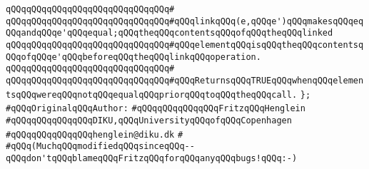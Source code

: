 \verb|qQQqqQQqqQQqqQQqqQQqqQQqqQQqqQQq#|\newline
\verb|qQQqqQQqqQQqqQQqqQQqqQQqqQQqqQQq#qQQqlinkqQQq(e,qQQqe')qQQqmakesqQQqeqQQqandqQQqe'qQQqequal;qQQqtheqQQqcontentsqQQqofqQQqtheqQQqlinked|\newline
\verb|qQQqqQQqqQQqqQQqqQQqqQQqqQQqqQQq#qQQqelementqQQqisqQQqtheqQQqcontentsqQQqofqQQqe'qQQqbeforeqQQqtheqQQqlinkqQQqoperation.|\newline
\verb|qQQqqQQqqQQqqQQqqQQqqQQqqQQqqQQq#|\newline
\verb|qQQqqQQqqQQqqQQqqQQqqQQqqQQqqQQq#qQQqReturnsqQQqTRUEqQQqwhenqQQqelementsqQQqwereqQQqnotqQQqequalqQQqpriorqQQqtoqQQqtheqQQqcall.|\newline
\verb|};|\newline
\newline
\newline
\verb|#qQQqOriginalqQQqAuthor:|\newline
\verb|#qQQqqQQqqQQqqQQqFritzqQQqHenglein|\newline
\verb|#qQQqqQQqqQQqqQQqDIKU,qQQqUniversityqQQqofqQQqCopenhagen|\newline
\verb|#qQQqqQQqqQQqqQQqhenglein@diku.dk|\newline
\verb|#|\newline
\verb|#qQQq(MuchqQQqmodifiedqQQqsinceqQQq--qQQqdon'tqQQqblameqQQqFritzqQQqforqQQqanyqQQqbugs!qQQq:-)|\newline

